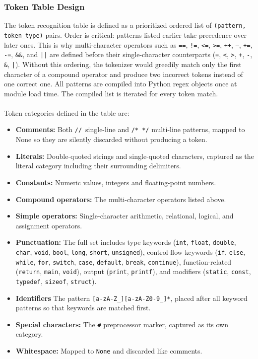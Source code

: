 \documentclass[letterpaper,12pt,oneside]{article}
\begin{document}
\subsubsection{Token Table Design}
The token recognition table is defined as a prioritized ordered list of \texttt{(pattern, token\_type)} pairs. Order is critical: patterns listed earlier take precedence over later ones. This is why multi-character operators such as \texttt{==}, \texttt{!=}, \texttt{<=}, \texttt{>=}, \texttt{++}, \texttt{--}, \texttt{+=}, \texttt{-=}, \texttt{\&\&}, and \texttt{||} are defined before their single-character counterparts (\texttt{=}, \texttt{<}, \texttt{>}, \texttt{+}, \texttt{-}, \texttt{\&}, \texttt{|}). Without this ordering, the tokenizer would greedily match only the first character of a compound operator and produce two incorrect tokens instead of one correct one.
All patterns are compiled into Python regex objects once at module load time. The compiled list is iterated for every token match.
\\ \\
Token categories defined in the table are:
\begin{itemize}
    \item \textbf{Comments:} Both \texttt{//}\ single-line and \texttt{/* */} multi-line patterns, mapped to None so they are silently discarded without producing a token.
    \item \textbf{Literals:} Double-quoted strings and single-quoted characters, captured as the literal category including their surrounding delimiters.
    \item \textbf{Constants:} Numeric values, integers and floating-point numbers.
    \item \textbf{Compound operators:} The multi-character operators listed above.
    \item \textbf{Simple operators:} Single-character arithmetic, relational, logical, and assignment operators.
    \item \textbf{Punctuation:} The full set includes type keywords (\texttt{int}, \texttt{float}, \texttt{double}, \texttt{char}, \texttt{void}, \texttt{bool}, \texttt{long}, \texttt{short}, \texttt{unsigned}), control-flow keywords (\texttt{if}, \texttt{else}, \texttt{while}, \texttt{for}, \texttt{switch}, \texttt{case}, \texttt{default}, \texttt{break}, \texttt{continue}), function-related (\texttt{return}, \texttt{main}, \texttt{void}), output (\texttt{print}, \texttt{printf}), and modifiers (\texttt{static}, \texttt{const}, \texttt{typedef}, \texttt{sizeof}, \texttt{struct}).
    \item \textbf{Identifiers} The pattern \verb|[a-zA-Z_][a-zA-Z0-9_]*|, placed after all keyword patterns so that keywords are matched first.
    \item \textbf{Special characters:} The \texttt{\#} preprocessor marker, captured as its own category.
    \item \textbf{Whitespace:} Mapped to \texttt{None} and discarded like comments.
\end{itemize}
\end{document}
